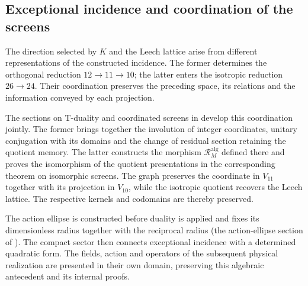 \subsection{Exceptional incidence and coordination of the screens}
\label{exc:pantallas-dualidad}

The direction selected by \(K\) and the Leech lattice arise
from different representations of the constructed incidence. The former
determines the orthogonal reduction \(12\to11\to10\); the latter
enters the isotropic reduction \(26\to24\). Their coordination
preserves the preceding space, its relations and the information conveyed
by each projection.

The sections on T-duality and coordinated screens in \cite{hmtX} develop
this coordination jointly. The former brings together the involution of
integer coordinates, unitary conjugation with its domains and the
change of residual section retaining the quotient memory. The latter
constructs the morphism \(\mathcal R_M^{\mathrm{alg}}\)
defined there and proves the isomorphism of the
quotient presentations in the corresponding theorem on isomorphic screens.
The graph preserves the coordinate in \(V_{11}\) together with its projection
in \(V_{10}\), while the isotropic quotient recovers the
Leech lattice. The respective kernels and codomains are thereby preserved.

The action ellipse is constructed before duality is applied and fixes
its dimensionless radius together with the reciprocal radius
(the action-ellipse section of \cite{hmtX}). The compact sector then connects
exceptional incidence with a determined quadratic form. The
fields, action and operators of the subsequent physical realization
are presented in their own domain, preserving this algebraic
antecedent and its internal proofs.
